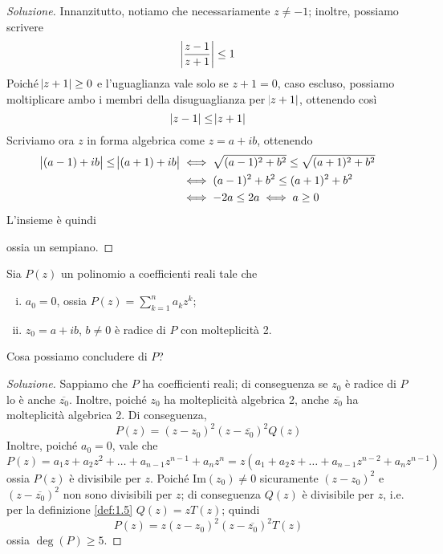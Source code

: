 \begin{proof}[Soluzione]
    Innanzitutto, notiamo che necessariamente $z\ne -1$; inoltre, possiamo scrivere
    \[
    \abs{\frac{z-1}{z+1}} \le 1
    \]
    Poiché $\abs{z+1}\ge 0$ e l'uguaglianza vale solo se $z+1=0$, caso escluso, possiamo moltiplicare ambo i membri della disuguaglianza per $\abs{z+1}$, ottenendo così
    \[
    \abs{z-1}\le \abs{z+1}
    \]
    Scriviamo ora $z$ in forma algebrica come $z=a+ib$, ottenendo
    \[
    \begin{split}
        \abs{(a-1)+ib}\le \abs{(a+1)+ib}& \iff \sqrt{(a-1)^2+b^2}\le \sqrt{(a+1)^2+b^2} \\
        &\iff (a-1)^2+b^2 \le (a+1)^2+b^2\\
        & \iff -2a \le 2a \iff a\ge 0
    \end{split}
    \]
    L'insieme è quindi
    \begin{center}
    \end{center}
    ossia un sempiano.
\end{proof}
\begin{exercise}
    \label{ex:3.8}
    Sia $P(z)$ un polinomio a coefficienti reali tale che 
    \begin{enumerate}[(i)]
        \item $a_0=0$, ossia $P(z) = \sum_{k=1}^n a_k z^k$;
        \item $z_0 = a+ib$, $b\ne 0$ è radice di $P$ con molteplicità 2.
    \end{enumerate}
    Cosa possiamo concludere di $P$?
\end{exercise}
\begin{proof}[Soluzione]
    Sappiamo che $P$ ha coefficienti reali; di conseguenza se $z_0$ è radice di $P$ lo è anche $\overline{z_0}$. Inoltre, poiché $z_0$ ha molteplicità algebrica 2, anche $\overline{z_0}$ ha molteplicità algebrica 2. Di conseguenza,
    \[
    P(z) = (z-z_0)^2(z-\overline{z_0})^2 Q(z)
    \]
    Inoltre, poiché $a_0=0$, vale che
    \[
    P(z) = a_1 z + a_2 z^2 + \dots + a_{n-1}z^{n-1}+a_n z^n = z(a_1 + a_2 z + \dots + a_{n-1}z^{n-2} + a_n z^{n-1})
    \]
    ossia $P(z)$ è divisibile per $z$. Poiché $\mathrm{Im}(z_0)\ne 0$ sicuramente $(z-z_0)^2$ e $(z-\overline{z_0})^2$ non sono divisibili per $z$; di conseguenza $Q(z)$ è divisibile per $z$, i.e. per la definizione \ref{def:1.5} $Q(z) = zT(z)$;
    quindi
    \[
    P(z) = z(z-z_0)^2(z-\overline{z_0})^2 T(z)
    \]
    ossia $\deg(P)\ge 5$.
\end{proof}
\newpage
